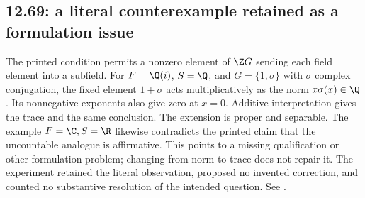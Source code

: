 \subsection{12.69: a literal counterexample retained as a formulation issue}
\label{prior:12.69}

The printed condition permits a nonzero element of
\(\Z G\) sending each field element into a subfield.
For \(F=\Q(i)\), \(S=\Q\), and \(G=\{1,\sigma\}\)
with \(\sigma\) complex conjugation, the fixed element
\(1+\sigma\) acts multiplicatively as the norm
\(x\sigma(x)\in\Q\). Its nonnegative exponents also
give zero at \(x=0\). Additive interpretation gives
the trace and the same conclusion.
The extension is proper and separable.
The example \(F=\C,S=\R\) likewise contradicts the
printed claim that the uncountable analogue is affirmative.
This points to a missing qualification or other formulation
problem; changing from norm to trace does not repair it.
The experiment retained the literal observation, proposed
no invented correction, and counted no substantive resolution
of the intended question. See
.
